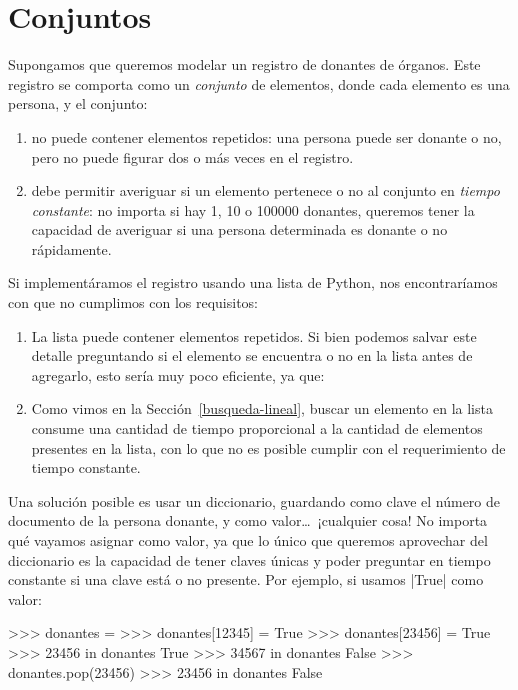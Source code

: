 \section{Conjuntos}

Supongamos que queremos modelar un registro de donantes de órganos.
Este registro se comporta como un \emph{conjunto} de elementos, donde cada
elemento es una persona, y el conjunto:

\begin{enumerate}
    \item no puede contener elementos repetidos: una persona puede ser donante
        o no, pero no puede figurar dos o más veces en el registro.
    \item debe permitir averiguar si un elemento pertenece o no al conjunto en
        \emph{tiempo constante}: no importa si hay 1, 10 o 100000 donantes,
        queremos tener la capacidad de averiguar si una persona determinada
        es donante o no rápidamente.
\end{enumerate}

Si implementáramos el registro usando una lista de Python, nos encontraríamos
con que no cumplimos con los requisitos:

\begin{enumerate}
    \item La lista puede contener elementos repetidos. Si bien podemos salvar este
        detalle preguntando si el elemento se encuentra o no en la lista antes
        de agregarlo, esto sería muy poco eficiente, ya que:
    \item Como vimos en la Sección~\ref{busqueda-lineal}, buscar un elemento en la
        lista consume una cantidad de tiempo proporcional a la cantidad de
        elementos presentes en la lista, con lo que no es posible cumplir con
        el requerimiento de tiempo constante.
\end{enumerate}

Una solución posible es usar un diccionario, guardando como clave el número de
documento de la persona donante, y como valor\ldots\ ¡cualquier cosa! No
importa qué vayamos asignar como valor, ya que lo único que queremos aprovechar
del diccionario es la capacidad de tener claves únicas y poder preguntar en
tiempo constante si una clave está o no presente. Por ejemplo, si usamos |True|
como valor:

\begin{codigo-python-sn}
>>> donantes = {}
>>> donantes[12345] = True
>>> donantes[23456] = True
>>> 23456 in donantes
True
>>> 34567 in donantes
False
>>> donantes.pop(23456)
>>> 23456 in donantes
False
\end{codigo-python-sn}

